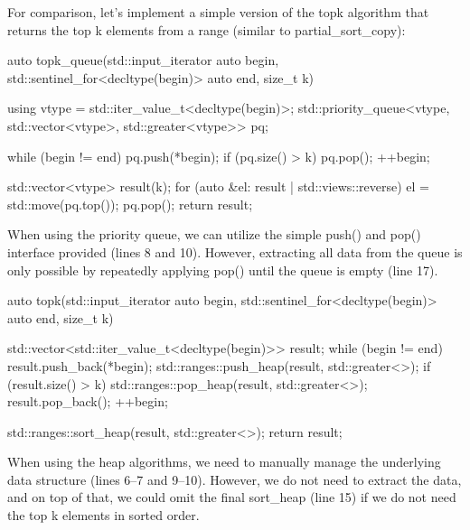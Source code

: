 

For comparison, let’s implement a simple version of the topk algorithm that returns the top k elements from a range (similar to partial\_sort\_copy):

\begin{box-note}
\begin{cppcode}
auto topk_queue(std::input_iterator auto begin, std::sentinel_for<decltype(begin)> auto end, 
                size_t k) {

    using vtype = std::iter_value_t<decltype(begin)>;
    std::priority_queue<vtype, std::vector<vtype>, std::greater<vtype>> pq;

    while (begin != end) {
        pq.push(*begin);
        if (pq.size() > k)
            pq.pop();
        ++begin;
    }

    std::vector<vtype> result(k);
    for (auto &el: result | std::views::reverse) {
        el = std::move(pq.top());
        pq.pop();
    }
    return result;    
}
\end{cppcode}
\end{box-note}

When using the priority queue, we can utilize the simple push() and pop() interface provided (lines 8 and 10). However, extracting all data from the queue is only possible by repeatedly applying pop() until the queue is empty (line 17).

\begin{box-note}
\begin{cppcode}
auto topk(std::input_iterator auto begin, std::sentinel_for<decltype(begin)> auto end, 
          size_t k) {
          
    std::vector<std::iter_value_t<decltype(begin)>> result;
    while (begin != end) {
        result.push_back(*begin);
        std::ranges::push_heap(result, std::greater<>{});
        if (result.size() > k) {
            std::ranges::pop_heap(result, std::greater<>{});
            result.pop_back();
        }
        ++begin;
    }
    
    std::ranges::sort_heap(result, std::greater<>{});
    return result;    
}
\end{cppcode}
\end{box-note}

When using the heap algorithms, we need to manually manage the underlying data structure (lines 6–7 and 9–10). However, we do not need to extract the data, and on top of that, we could omit the final sort\_heap (line 15) if we do not need the top k elements in sorted order.

